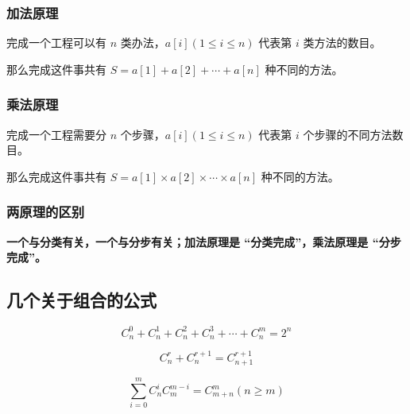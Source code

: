 \subsubsection{加法原理}

完成一个工程可以有 $n$ 类办法，$a[i](1 \le i \le n)$ 代表第 $i$ 类方法的数目。  

那么完成这件事共有 $S=a[1]+a[2]+\cdots +a[n]$ 种不同的方法。

\subsubsection{乘法原理}

完成一个工程需要分 $n$ 个步骤，$a[i](1 \le i \le n)$ 代表第 $i$ 个步骤的不同方法数目。  

那么完成这件事共有 $S = a[1] \times a[2] \times \cdots \times a[n]$ 种不同的方法。

\subsubsection{两原理的区别}

\textbf{ 一个与分类有关，一个与分步有关；加法原理是 “分类完成”，乘法原理是 “分步完成”。}

\subsection{几个关于组合的公式}

$$
C_n^0 + C_n^1 + C_n^2 + C_n^3 + \cdots + C_n^m = 2^n
$$

$$
C_n^r + C_n^{r+1} = C_{n+1}^{r+1}
$$

$$
\sum_{i=0}^m C_n^i C_m^{m-i} = C_{m+n}^m(n \geq m)
$$
